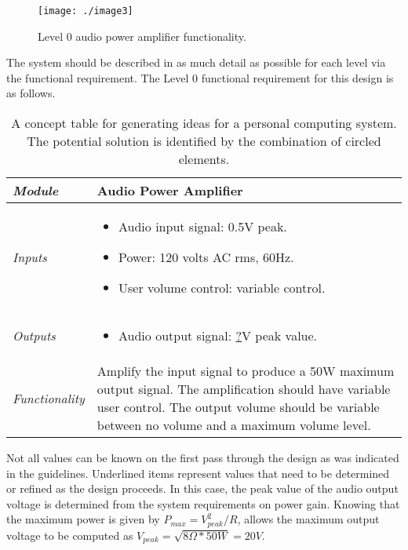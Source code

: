 \begin{figure}
\texttt{[image: ./image3]}
\caption{Level 0 audio power amplifier functionality.}
\label{figure:level0PowerAmp}
\end{figure}


The system should be described in as much detail as possible for each
level via the functional requirement. The Level 0 functional requirement
for this design is as follows.

\begin{table}
\caption{A concept table for generating ideas for a personal
computing system. The potential so­lution is identified by the
combination of circled elements.}
\label{table:conceptPersonalComputing}
\begin{tabular}{|l|m{10cm}|}
\hline
\emph{Module} &
Audio Power Amplifier \\ \hline

\emph{Inputs} & 
\begin{itemize}
\item
  Audio input signal: 0.5V peak.
\item
  Power: 120 volts AC rms, 60Hz.
\item
  User volume control: variable control.
\end{itemize} \\ \hline

\emph{Outputs} & 
\begin{itemize}
\item
  Audio output signal: \ul{?}V peak value.
\end{itemize}  \\ \hline

\emph{Functionality} & Amplify the input signal to produce a 50W maximum
output signal. The amplification should have variable user control. The
output volume should be variable between no volume and a maximum volume
level. \\ \hline
\end{tabular}
\end{table}

Not all values can be known on the first pass through the design as was
indicated in the guidelines. Underlined items represent values that need
to be determined or refined as the design proceeds. In this case, the
peak value of the audio output voltage is determined from the system
requirements on power gain. Knowing that the maximum power is given by
$P_{max} = V_{peak}^2 / R$, allows the maximum output voltage to be 
computed as  $V_{peak} = \sqrt{8\Omega*50W} = 20V$.

